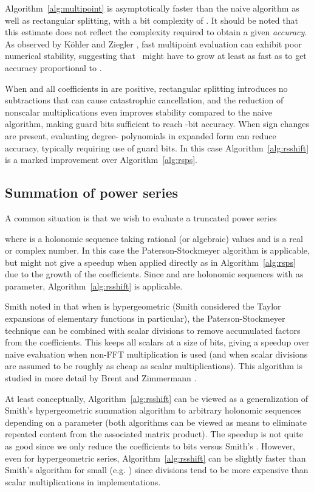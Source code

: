 \documentclass{sig-alternate}
\begin{document}
Algorithm~\ref{alg:multipoint} is asymptotically
faster than the naive algorithm as well
as rectangular splitting, with a
bit complexity of .
It should be noted that this estimate does not reflect the complexity
required to obtain a given \emph{accuracy}.
As observed by K\"{o}hler and Ziegler \cite{KohlerZiegler2008},
fast multipoint evaluation can exhibit
poor numerical stability,
suggesting that~ might have to
grow at least as fast as  to get accuracy proportional to .

When  and all coefficients in  are
positive, rectangular splitting introduces no subtractions that
can cause catastrophic cancellation, and the reduction
of nonscalar multiplications
even improves stability compared to the naive algorithm,
making  guard bits sufficient to reach -bit accuracy.
When sign changes are present, evaluating degree-
polynomials in expanded form can reduce accuracy, typically
requiring use of  guard bits. In this case
Algorithm~\ref{alg:rsshift} is a
marked improvement over Algorithm~\ref{alg:rsps}.

\subsection{Summation of power series}

A common situation is that we wish to evaluate
a truncated power series

where  is a holonomic sequence taking rational (or algebraic)
values and  is a real or complex number.
In this case the Paterson-Stockmeyer algorithm is applicable,
but might not give a speedup when applied directly
as in Algorithm~\ref{alg:rsps} due to the growth of the coefficients.
Since  and  are
holonomic sequences with  as parameter,
Algorithm~\ref{alg:rsshift} is applicable.

Smith noted in \cite{Smith1989} that when  is hypergeometric
(Smith considered the Taylor expansions of elementary functions
in particular),
the Paterson-Stockmeyer technique can be combined with scalar divisions
to remove accumulated factors from the coefficients.
This keeps all scalars at a size of  bits,
giving a speedup over naive evaluation when
non-FFT multiplication is used
(and when scalar divisions are assumed to be roughly
as cheap as scalar multiplications).
This algorithm is studied in more detail by Brent and Zimmermann \cite{mca}.

At least conceptually, Algorithm~\ref{alg:rsshift} can be viewed as a
generalization of Smith's hypergeometric summation algorithm
to arbitrary holonomic sequences depending on a parameter
(both algorithms can be viewed as means to
eliminate repeated content from the associated matrix product).
The speedup is not quite as good since we only reduce
the coefficients to  bits versus Smith's .
However, even for hypergeometric series, Algorithm~\ref{alg:rsshift}
can be slightly faster than Smith's algorithm for small 
(e.g. ) since divisions tend to be more expensive than
scalar multiplications in implementations.
\end{document}
